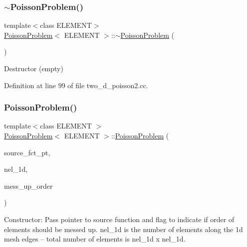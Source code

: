 \subsubsection{\texorpdfstring{$\sim$\+Poisson\+Problem()}{~PoissonProblem()}\hspace{0.1cm}{\footnotesize\ttfamily [2/3]}}
{\footnotesize\ttfamily template$<$class E\+L\+E\+M\+E\+NT$>$ \\
\hyperlink{classPoissonProblem}{Poisson\+Problem}$<$ E\+L\+E\+M\+E\+NT $>$\+::$\sim$\hyperlink{classPoissonProblem}{Poisson\+Problem} (\begin{DoxyParamCaption}{ }\end{DoxyParamCaption})\hspace{0.3cm}{\ttfamily [inline]}}



Destructor (empty) 



Definition at line 99 of file two\+\_\+d\+\_\+poisson2.\+cc.

\mbox{\label{classPoissonProblem_a63fe78758ad74469e7f6a20b4613525a}} 
\subsubsection{\texorpdfstring{Poisson\+Problem()}{PoissonProblem()}\hspace{0.1cm}{\footnotesize\ttfamily [3/3]}}
{\footnotesize\ttfamily template$<$class E\+L\+E\+M\+E\+NT $>$ \\
\hyperlink{classPoissonProblem}{Poisson\+Problem}$<$ E\+L\+E\+M\+E\+NT $>$\+::\hyperlink{classPoissonProblem}{Poisson\+Problem} (\begin{DoxyParamCaption}\item[{Poisson\+Equations$<$ 2 $>$\+::Poisson\+Source\+Fct\+Pt}]{source\+\_\+fct\+\_\+pt,  }\item[{const unsigned \&}]{nel\+\_\+1d,  }\item[{const bool \&}]{mess\+\_\+up\+\_\+order }\end{DoxyParamCaption})}



Constructor\+: Pass pointer to source function and flag to indicate if order of elements should be messed up. nel\+\_\+1d is the number of elements along the 1d mesh edges -- total number of elements is nel\+\_\+1d x nel\+\_\+1d. 

